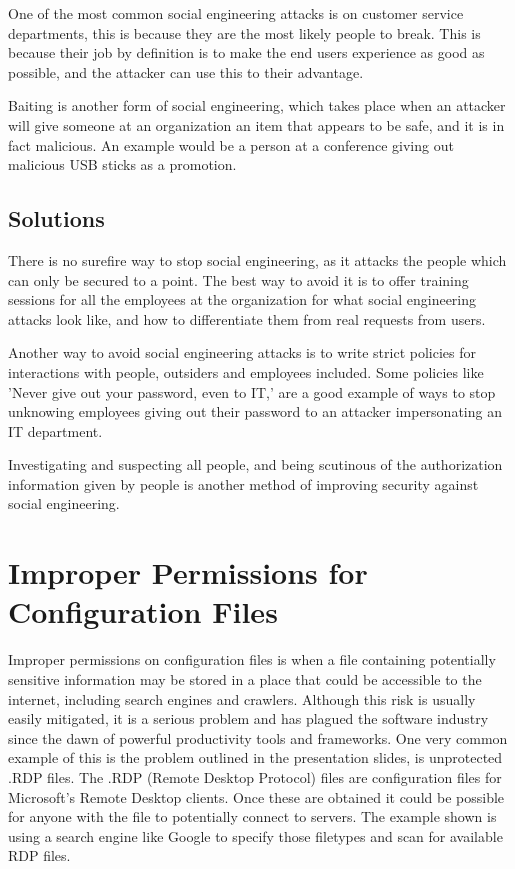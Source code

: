 \documentclass{article}
\numberwithin{equation}{section} %
\numberwithin{figure}{section} %
\numberwithin{table}{section} %
\begin{document}
One of the most common social engineering attacks is on customer service departments, this is because they are the most likely people to break.  This is because their job by definition is to make the end users experience as good as possible, and the attacker can use this to their advantage. 

Baiting is another form of social engineering, which takes place when an attacker will give someone at an organization an item that appears to be safe, and it is in fact malicious.  An example would be a person at a conference giving out malicious USB sticks as a promotion.

\subsection{Solutions}
There is no surefire way to stop social engineering, as it attacks the people which can only be secured to a point.  The best way to avoid it is to offer training sessions for all the employees at the organization for what social engineering attacks look like, and how to differentiate them from real requests from users.

Another way to avoid social engineering attacks is to write strict policies for interactions with people, outsiders and employees included.  Some policies like 'Never give out your password, even to IT,' are a good example of ways to stop unknowing employees giving out their password to an attacker impersonating an IT department.  

Investigating and suspecting all people, and being scutinous of the authorization information given by people is another method of improving security against social engineering.  

\section{Improper Permissions for Configuration Files}
Improper permissions on configuration files is when a file containing potentially sensitive information may be stored in a place that could be accessible to the internet, including search engines and crawlers.  Although this risk is usually easily mitigated, it is a serious problem and has plagued the software industry since the dawn of powerful productivity tools and frameworks.  One very common example of this is the problem outlined in the presentation slides, is unprotected .RDP files.\cite{presentation}  The .RDP (Remote Desktop Protocol) files are configuration files for Microsoft's Remote Desktop clients.  Once these are obtained it could be possible for anyone with the file to potentially connect to servers.  The example shown is using a search engine like Google to specify those filetypes and scan for available RDP files.
\end{document}
